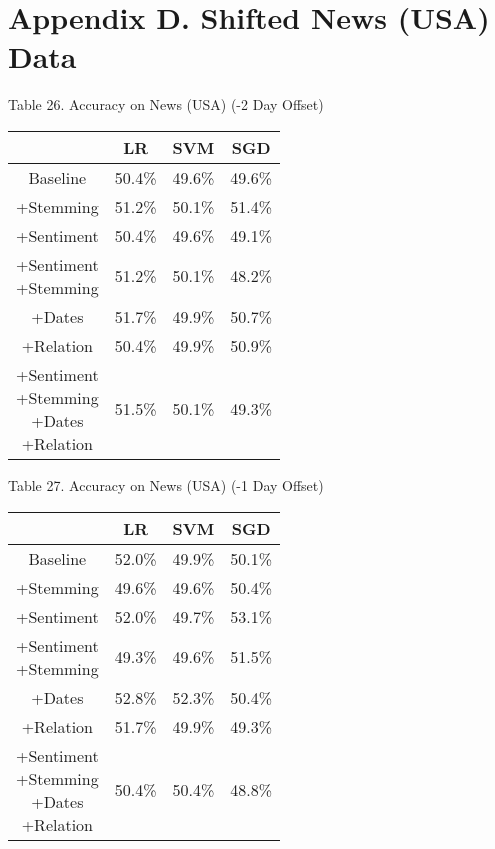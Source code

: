 \documentclass[11pt,a4paper]{article}
\begin{document}
\section{Appendix D. Shifted News (USA) Data}
\begin{center}
Table 26. Accuracy on News (USA) (-2 Day Offset)\\
\begin{tabular}{ |c|c|c|c| }
 \hline
  & LR & SVM & SGD \\
  \hline
  Baseline & 50.4\% & 49.6\% & 49.6\% \\
  \hline
 +Stemming & 51.2\% & 50.1\% & 51.4\% \\
  \hline
 +Sentiment & 50.4\% & 49.6\% & 49.1\% \\
  \hline
  \shortstack{+Sentiment \\ +Stemming} & 51.2\% & 50.1\% & 48.2\%\\
 \hline
 +Dates & 51.7\% & 49.9\% & 50.7\% \\
  \hline
 +Relation & 50.4\% & 49.9\% & 50.9\% \\
  \hline
  \shortstack{+Sentiment \\ +Stemming \\+Dates \\+Relation} & 51.5\% & 50.1\% & 49.3\% \\
 \hline
\end{tabular}
\end{center}

\begin{center}
Table 27. Accuracy on News (USA) (-1 Day Offset)\\
\begin{tabular}{ |c|c|c|c| }
 \hline
  & LR & SVM & SGD \\
  \hline
  Baseline & 52.0\% & 49.9\% & 50.1\% \\
  \hline
 +Stemming & 49.6\% & 49.6\% & 50.4\% \\
  \hline
 +Sentiment & 52.0\% & 49.7\%  & 53.1\% \\
  \hline
  \shortstack{+Sentiment \\ +Stemming} & 49.3\% & 49.6\% & 51.5\%\\
 \hline
 +Dates & 52.8\% & 52.3\% & 50.4\% \\
  \hline
 +Relation & 51.7\% & 49.9\% & 49.3\% \\
  \hline
  \shortstack{+Sentiment \\ +Stemming \\+Dates \\+Relation} & 50.4\% & 50.4\% & 48.8\% \\
 \hline
\end{tabular}
\end{center}
\end{document}

